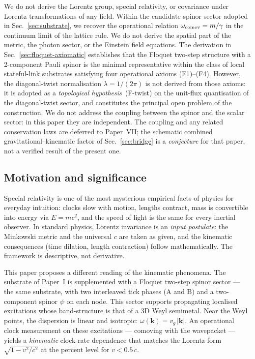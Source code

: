 \documentclass[11pt,a4paper]{article}
\begin{document}
We do not derive the Lorentz group, special relativity, or
covariance under Lorentz transformations of any field. Within
the candidate spinor sector adopted in Sec.~\ref{sec:substrate},
we recover the operational relation $\omega_{\rm comov} =
m/\gamma$ in the continuum limit of the lattice rule. We do not
derive the spatial part of the metric, the photon sector, or
the Einstein field equations. The derivation in
Sec.~\ref{sec:floquet-axiomatic} establishes that the Floquet
two-step structure with a 2-component Pauli spinor is the
minimal representative within the class of local stateful-link
substrates satisfying four operational axioms (F1)--(F4).
However, the diagonal-twist normalisation $\lambda = 1/(2\pi)$
is not derived from those axioms: it is adopted as a
\emph{topological hypothesis}~(F-twist) on the unit-flux
quantisation of the diagonal-twist sector, and constitutes the
principal open problem of the construction. We do not address
the coupling between the spinor and the scalar sector: in this
paper they are independent. The coupling and any related
conservation laws are deferred to Paper~VII; the schematic
combined gravitational--kinematic factor of
Sec.~\ref{sec:bridge} is a \emph{conjecture} for that paper,
not a verified result of the present one.

\subsection*{Motivation and significance}

Special relativity is one of the most mysterious empirical facts of
physics for everyday intuition: clocks slow with motion, lengths
contract, mass is convertible into energy via $E = mc^2$, and the
speed of light is the same for every inertial observer. In standard
physics, Lorentz invariance is an \emph{input postulate}: the
Minkowski metric and the universal $c$ are taken as given, and the
kinematic consequences (time dilation, length contraction) follow
mathematically. The framework is descriptive, not derivative.

This paper proposes a different reading of the kinematic phenomena.
The substrate of Paper~I is supplemented with a Floquet two-step
spinor sector --- the same substrate, with two interleaved tick
phases (A and B) and a two-component spinor $\psi$ on each node.
This sector supports propagating localised excitations whose
band-structure is that of a 3D Weyl semimetal. Near the Weyl points,
the dispersion is linear and isotropic: $\omega(\mathbf{k}) =
v_g\,|\mathbf{k}|$. An operational clock measurement on these
excitations --- comoving with the wavepacket --- yields a
\emph{kinematic} clock-rate dependence that matches the Lorentz form
$\sqrt{1 - v^2/c^2}$ at the percent level for $v < 0.5\,c$.
\end{document}
